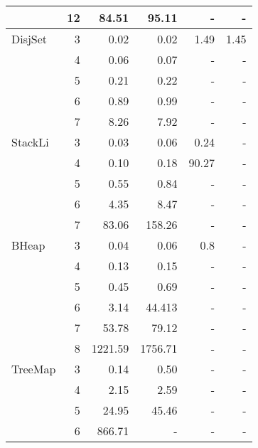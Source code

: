 \begin{table}[H]
\begin{tabular}{ l r | r | r | r | r  }
&	12	&	84.51	&	95.11	&	-	&	-	\\
  \midrule
  DisjSet
&	3	&	0.02	&	0.02	&	1.49	&	1.45	\\
&	4	&	0.06	&	0.07	&	-	&	-	\\
&	5	&	0.21	&	0.22	&	-	&	-	\\
&	6	&	0.89	&	0.99	&	-	&	-	\\
&	7	&	8.26	&	7.92	&	-	&	-	\\
  \midrule
  StackLi
&	3	&	0.03	&	0.06	&	0.24	&	-	\\
&	4	&	0.10	&	0.18	&	90.27	&	-	\\
&	5	&	0.55	&	0.84	&	-	&	-	\\
&	6	&	4.35	&	8.47	&	-	&	-	\\
&	7	&	83.06	&	158.26	&	-	&	-	\\
  \midrule
  BHeap
&	3	&	0.04	&	0.06	&	0.8	&	-	\\
&	4	&	0.13	&	0.15	&	-	&	-	\\
&	5	&	0.45	&	0.69	&	-	&	-	\\
&	6	&	3.14	&	44.413	&	-	&	-	\\
&	7	&	53.78	&	79.12	&	-	&	-	\\
&	8	&	1221.59	&	1756.71	&	-	&	-	\\
\midrule
  TreeMap
&	3	&	0.14	&	0.50	&	-	&	-	\\
&	4	&	2.15	&	2.59	&	-	&	-	\\
&	5	&	24.95	&	45.46	&	-	&	-	\\
&	6	&	866.71	&	-	&	-	&	-	\\
  \bottomrule
\end{tabular}
\end{table}

